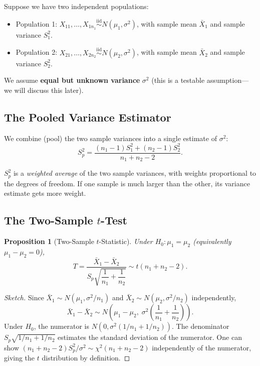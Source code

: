 \documentclass[12pt, a4paper, oneside]{book}
\theoremstyle{definition}
\theoremstyle{plain}
\newtheorem{proposition}{Proposition}[section]
\theoremstyle{remark}
\newcommand{\iid}{\overset{\text{iid}}{\sim}}
\begin{document}
Suppose we have two independent populations:
\begin{itemize}
  \item Population 1: $X_{11},\ldots,X_{1n_1}\iid N(\mu_1,\sigma^2)$, with
        sample mean $\bar{X}_1$ and sample variance $S_1^2$.
  \item Population 2: $X_{21},\ldots,X_{2n_2}\iid N(\mu_2,\sigma^2)$, with
        sample mean $\bar{X}_2$ and sample variance $S_2^2$.
\end{itemize}

We assume \textbf{equal but unknown variance} $\sigma^2$ (this is a
testable assumption---we will discuss this later).

\subsection{The Pooled Variance Estimator}

We combine (pool) the two sample variances into a single estimate of $\sigma^2$:
\[
  S_p^2 = \frac{(n_1-1)S_1^2 + (n_2-1)S_2^2}{n_1+n_2-2}.
\]

\begin{intuition}
$S_p^2$ is a \emph{weighted average} of the two sample variances, with
weights proportional to the degrees of freedom.  If one sample is much
larger than the other, its variance estimate gets more weight.
\end{intuition}

\subsection{The Two-Sample $t$-Test}

\begin{proposition}[Two-Sample $t$-Statistic]
Under $H_0: \mu_1 = \mu_2$ (equivalently $\mu_1-\mu_2 = 0$),
\[
  T = \frac{\bar{X}_1 - \bar{X}_2}{S_p\sqrt{\dfrac{1}{n_1}+\dfrac{1}{n_2}}}
  \sim t(n_1+n_2-2).
\]
\end{proposition}

\begin{proof}[Sketch]
Since $\bar{X}_1\sim N(\mu_1,\sigma^2/n_1)$ and $\bar{X}_2\sim N(\mu_2,\sigma^2/n_2)$
independently,
\[
  \bar{X}_1 - \bar{X}_2 \sim N\!\left(\mu_1-\mu_2,\;\sigma^2\!\left(\frac{1}{n_1}+\frac{1}{n_2}\right)\right).
\]
Under $H_0$, the numerator is $N(0,\sigma^2(1/n_1+1/n_2))$.  The
denominator $S_p\sqrt{1/n_1+1/n_2}$ estimates the standard deviation of the
numerator.  One can show $(n_1+n_2-2)S_p^2/\sigma^2\sim\chi^2(n_1+n_2-2)$
independently of the numerator, giving the $t$ distribution by definition.
\end{proof}
\end{document}

